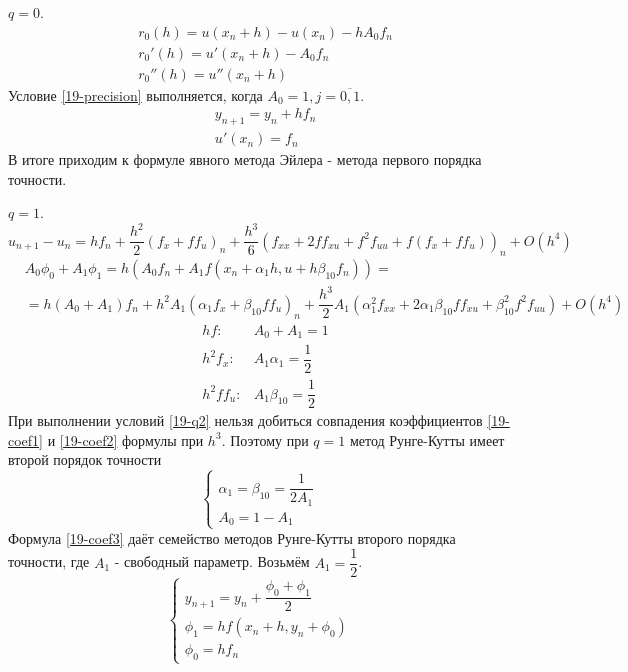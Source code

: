 \begin{examples}
  \item $q = 0$.
  \begin{align*}
    &r_0(h) = u(x_n + h) - u(x_n) - hA_0f_n\\
    &r_0'(h) = u'(x_n + h) - A_0f_n\\
    &r_0''(h) = u''(x_n + h)
  \end{align*}
  Условие \eqref{19-precision} выполняется, когда $A_0 = 1, j = \overline{0, 1}$.
  \begin{align*}
    &y_{n + 1} = y_n + hf_n\\
    &u'(x_n) = f_n
  \end{align*}
  В итоге приходим к формуле явного метода Эйлера - метода первого порядка
  точности.
  \item $q = 1$.
  \begin{equation}
    \label{19-coef1}
    u_{n + 1} - u_n = hf_n + \dfrac{h^2}{2}(f_x + ff_u)_n +
    \dfrac{h^3}{6}(f_{xx} + 2ff_{xu} + f^2f_{uu} + f(f_x + ff_u))_n + O(h^4)
  \end{equation}
  \begin{equation}
    \label{19-coef2}
    \begin{split}
      &A_0\phi_0 + A_1\phi_1 = h(A_0f_n + A_1f(x_n + \alpha_1h, u + h\beta_{10}f_n)) =\\
      &= h(A_0 + A_1)f_n + h^2A_1(\alpha_1f_x + \beta_{10}ff_u)_n +
      \dfrac{h^3}{2}A_1(\alpha_1^2f_{xx} + 2\alpha_1\beta_{10}ff_{xu} + \beta_{10}^2
      f^2f_{uu}) + O(h^4)
    \end{split}
  \end{equation}
  \begin{equation}
    \label{19-q2}
    \begin{aligned}
      &hf: &A_0 + A_1 = 1\\
      &h^2f_x: &A_1\alpha_1 = \dfrac{1}{2}\\
      &h^2ff_u: &A_1\beta_{10} = \dfrac{1}{2}
    \end{aligned}
  \end{equation}
  При выполнении условий \eqref{19-q2} нельзя добиться совпадения коэффициентов
  \eqref{19-coef1} и \eqref{19-coef2} формулы при $h^3$. Поэтому при $q = 1$
  метод Рунге-Кутты имеет второй порядок точности
  \begin{equation}
    \label{19-coef3}
    \begin{cases}
      \alpha_1 = \beta_{10} = \dfrac{1}{2A_1}\\
      A_0 = 1 - A_1
    \end{cases}
  \end{equation}
  Формула \eqref{19-coef3} даёт семейство методов Рунге-Кутты второго порядка
  точности, где $A_1$ - свободный параметр. Возьмём $A_1 = \dfrac{1}{2}$.
  \begin{equation}
    \begin{cases}
      y_{n + 1} = y_n + \dfrac{\phi_0 + \phi_1}{2}\\
      \phi_1 = hf(x_n + h, y_n + \phi_0)\\
      \phi_0 = hf_n
    \end{cases}
  \end{equation}


\end{examples}

